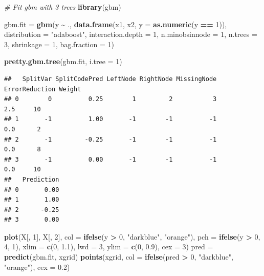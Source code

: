 \documentclass[
]{book}
\newenvironment{Shaded}{\begin{snugshade}}{\end{snugshade}}
\newcommand{\AttributeTok}[1]{\textcolor[rgb]{0.13,0.29,0.53}{#1}}
\newcommand{\CommentTok}[1]{\textcolor[rgb]{0.56,0.35,0.01}{\textit{#1}}}
\newcommand{\DecValTok}[1]{\textcolor[rgb]{0.00,0.00,0.81}{#1}}
\newcommand{\FloatTok}[1]{\textcolor[rgb]{0.00,0.00,0.81}{#1}}
\newcommand{\FunctionTok}[1]{\textcolor[rgb]{0.13,0.29,0.53}{\textbf{#1}}}
\newcommand{\NormalTok}[1]{#1}
\newcommand{\OtherTok}[1]{\textcolor[rgb]{0.56,0.35,0.01}{#1}}
\newcommand{\SpecialCharTok}[1]{\textcolor[rgb]{0.81,0.36,0.00}{\textbf{#1}}}
\newcommand{\StringTok}[1]{\textcolor[rgb]{0.31,0.60,0.02}{#1}}
\begin{document}
\begin{Shaded}
\begin{Highlighting}[]
\CommentTok{\# Fit gbm with 3 trees}
\FunctionTok{library}\NormalTok{(gbm)}

\NormalTok{gbm.fit }\OtherTok{=} \FunctionTok{gbm}\NormalTok{(y }\SpecialCharTok{\textasciitilde{}}\NormalTok{ ., }\FunctionTok{data.frame}\NormalTok{(x1, x2, }\AttributeTok{y =} \FunctionTok{as.numeric}\NormalTok{(y }\SpecialCharTok{==} \DecValTok{1}\NormalTok{)),}
    \AttributeTok{distribution =} \StringTok{"adaboost"}\NormalTok{, }\AttributeTok{interaction.depth =} \DecValTok{1}\NormalTok{, }\AttributeTok{n.minobsinnode =} \DecValTok{1}\NormalTok{,}
    \AttributeTok{n.trees =} \DecValTok{3}\NormalTok{, }\AttributeTok{shrinkage =} \DecValTok{1}\NormalTok{, }\AttributeTok{bag.fraction =} \DecValTok{1}\NormalTok{)}

\FunctionTok{pretty.gbm.tree}\NormalTok{(gbm.fit, }\AttributeTok{i.tree =} \DecValTok{1}\NormalTok{)}
\end{Highlighting}
\end{Shaded}

\begin{verbatim}
##   SplitVar SplitCodePred LeftNode RightNode MissingNode ErrorReduction Weight
## 0        0          0.25        1         2           3            2.5     10
## 1       -1          1.00       -1        -1          -1            0.0      2
## 2       -1         -0.25       -1        -1          -1            0.0      8
## 3       -1          0.00       -1        -1          -1            0.0     10
##   Prediction
## 0       0.00
## 1       1.00
## 2      -0.25
## 3       0.00
\end{verbatim}

\begin{Shaded}
\begin{Highlighting}[]
\FunctionTok{plot}\NormalTok{(X[, }\DecValTok{1}\NormalTok{], X[, }\DecValTok{2}\NormalTok{], }\AttributeTok{col =} \FunctionTok{ifelse}\NormalTok{(y }\SpecialCharTok{\textgreater{}} \DecValTok{0}\NormalTok{, }\StringTok{"darkblue"}\NormalTok{, }\StringTok{"orange"}\NormalTok{),}
    \AttributeTok{pch =} \FunctionTok{ifelse}\NormalTok{(y }\SpecialCharTok{\textgreater{}} \DecValTok{0}\NormalTok{, }\DecValTok{4}\NormalTok{, }\DecValTok{1}\NormalTok{), }\AttributeTok{xlim =} \FunctionTok{c}\NormalTok{(}\DecValTok{0}\NormalTok{, }\FloatTok{1.1}\NormalTok{), }\AttributeTok{lwd =} \DecValTok{3}\NormalTok{, }\AttributeTok{ylim =} \FunctionTok{c}\NormalTok{(}\DecValTok{0}\NormalTok{,}
        \FloatTok{0.9}\NormalTok{), }\AttributeTok{cex =} \DecValTok{3}\NormalTok{)}
\NormalTok{pred }\OtherTok{=} \FunctionTok{predict}\NormalTok{(gbm.fit, xgrid)}
\FunctionTok{points}\NormalTok{(xgrid, }\AttributeTok{col =} \FunctionTok{ifelse}\NormalTok{(pred }\SpecialCharTok{\textgreater{}} \DecValTok{0}\NormalTok{, }\StringTok{"darkblue"}\NormalTok{, }\StringTok{"orange"}\NormalTok{), }\AttributeTok{cex =} \FloatTok{0.2}\NormalTok{)}
\end{Highlighting}
\end{Shaded}
\end{document}
